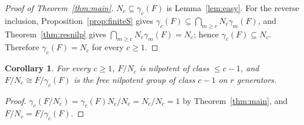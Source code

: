\documentclass{amsart}
\newtheorem{corollary}{Corollary}
\theoremstyle{definition}
\theoremstyle{remark}
\begin{document}
\begin{proof}[Proof of Theorem~\ref{thm:main}]
$N_c\subseteq\gamma_c(F)$ is Lemma~\ref{lem:easy}. For the reverse inclusion,
Proposition~\ref{prop:finiteS} gives $\gamma_c(F)\subseteq\bigcap_{m\ge c}
N_c\gamma_m(F)$, and Theorem~\ref{thm:resnilp} gives
$\bigcap_{m\ge c}N_c\gamma_m(F)=N_c$; hence $\gamma_c(F)\subseteq N_c$. Therefore
$\gamma_c(F)=N_c$ for every $c\ge1$.
\end{proof}

\begin{corollary}\label{cor:nilp}
For every $c\ge1$, $F/N_c$ is nilpotent of class $\le c-1$, and
$F/N_c\cong F/\gamma_c(F)$ is the free nilpotent group of class $c-1$ on $r$
generators.
\end{corollary}
\begin{proof}
$\gamma_c(F/N_c)=\gamma_c(F)N_c/N_c=N_c/N_c=1$ by Theorem~\ref{thm:main}, and
$F/N_c=F/\gamma_c(F)$.
\end{proof}
\end{document}
